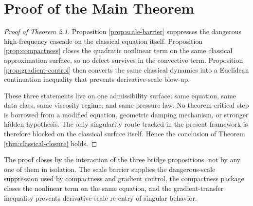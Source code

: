 \section{Proof of the Main Theorem}

\begin{proof}[Proof of Theorem 2.1]
Proposition \ref{prop:scale-barrier} suppresses the dangerous high-frequency cascade on the classical equation itself. Proposition \ref{prop:compactness} closes the quadratic nonlinear term on the same classical approximation surface, so no defect survives in the convective term. Proposition \ref{prop:gradient-control} then converts the same classical dynamics into a Euclidean continuation inequality that prevents derivative-scale blow-up.

These three statements live on one admissibility surface: same equation, same data class, same viscosity regime, and same pressure law. No theorem-critical step is borrowed from a modified equation, geometric damping mechanism, or stronger hidden hypothesis. The only singularity route tracked in the present framework is therefore blocked on the classical surface itself. Hence the conclusion of Theorem \ref{thm:classical-closure} holds.
\end{proof}

\begin{remark}
The proof closes by the interaction of the three bridge propositions, not by any one of them in isolation. The scale barrier supplies the dangerous-scale suppression used by compactness and gradient control, the compactness package closes the nonlinear term on the same equation, and the gradient-transfer inequality prevents derivative-scale re-entry of singular behavior.
\end{remark}
